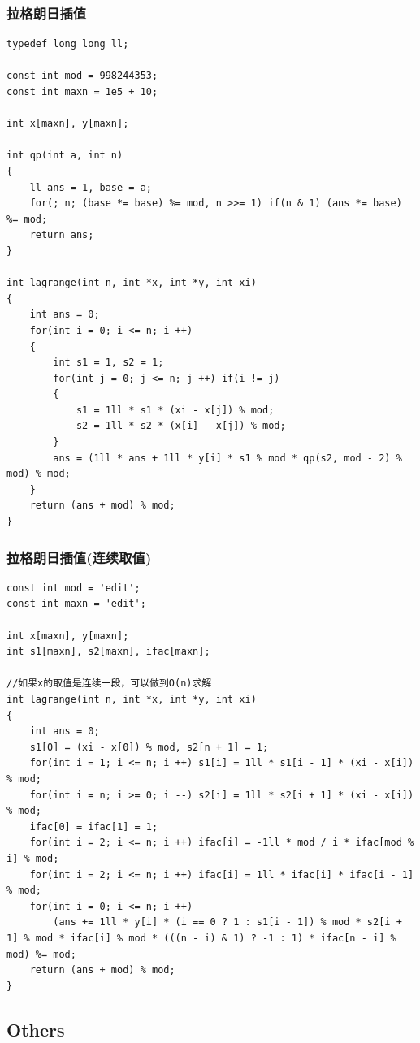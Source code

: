 \documentclass[twoside]{article}
\begin{document}
\subsubsection{拉格朗日插值}
\begin{lstlisting}
typedef long long ll;

const int mod = 998244353;
const int maxn = 1e5 + 10;

int x[maxn], y[maxn];

int qp(int a, int n)
{
	ll ans = 1, base = a;
	for(; n; (base *= base) %= mod, n >>= 1) if(n & 1) (ans *= base) %= mod;
	return ans;
}

int lagrange(int n, int *x, int *y, int xi)
{
	int ans = 0;
	for(int i = 0; i <= n; i ++)
	{
		int s1 = 1, s2 = 1;
		for(int j = 0; j <= n; j ++) if(i != j)
		{
			s1 = 1ll * s1 * (xi - x[j]) % mod;
			s2 = 1ll * s2 * (x[i] - x[j]) % mod;
		}
		ans = (1ll * ans + 1ll * y[i] * s1 % mod * qp(s2, mod - 2) % mod) % mod;
	}
	return (ans + mod) % mod;
}
\end{lstlisting}
\subsubsection{拉格朗日插值(连续取值)}
\begin{lstlisting}
const int mod = 'edit';
const int maxn = 'edit';

int x[maxn], y[maxn];
int s1[maxn], s2[maxn], ifac[maxn];

//如果x的取值是连续一段，可以做到O(n)求解
int lagrange(int n, int *x, int *y, int xi)
{
	int ans = 0;
	s1[0] = (xi - x[0]) % mod, s2[n + 1] = 1;
	for(int i = 1; i <= n; i ++) s1[i] = 1ll * s1[i - 1] * (xi - x[i]) % mod;
	for(int i = n; i >= 0; i --) s2[i] = 1ll * s2[i + 1] * (xi - x[i]) % mod;
	ifac[0] = ifac[1] = 1;
	for(int i = 2; i <= n; i ++) ifac[i] = -1ll * mod / i * ifac[mod % i] % mod;
	for(int i = 2; i <= n; i ++) ifac[i] = 1ll * ifac[i] * ifac[i - 1] % mod;
	for(int i = 0; i <= n; i ++)
		(ans += 1ll * y[i] * (i == 0 ? 1 : s1[i - 1]) % mod * s2[i + 1] % mod * ifac[i] % mod * (((n - i) & 1) ? -1 : 1) * ifac[n - i] % mod) %= mod;
	return (ans + mod) % mod;
}\end{lstlisting}
\subsection{Others}
\end{document}
